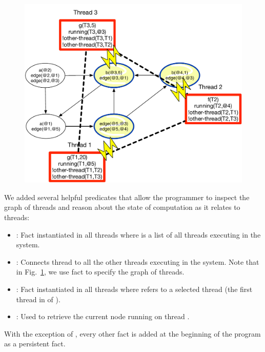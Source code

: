 \begin{figure}[ht]
   \includegraphics[width=0.6\linewidth]{figures/threads/threads.pdf}


   \label{fig:coord:thread_facts}
\end{figure}

We added several helpful predicates that allow the programmer to inspect the
graph of threads and reason about the state of computation as it relates to
threads:

\begin{itemize}
   \item {}: Fact instantiated in all threads where
       is a list of all threads executing in the system.

   \item {}: Connects thread  to all the
      other threads  executing in the system. Note that in
      Fig.~\ref{fig:coord:thread_facts}, we use  fact
      to specify the graph of threads.


   \item {}: Fact instantiated in all
      threads where  refers to a selected thread (the first thread
      in  of ).

   \item {}: Used to retrieve the current node 
      running on thread .
\end{itemize}

With the exception of , every other fact is added at the beginning
of the program as a persistent fact.


